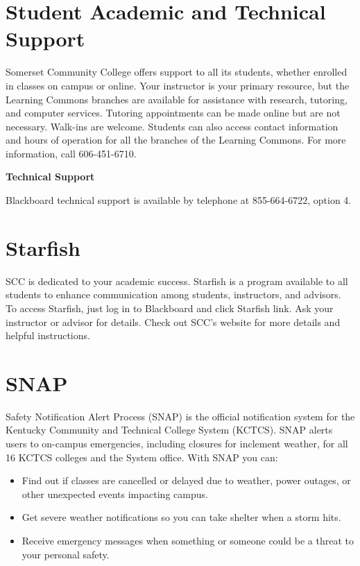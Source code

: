 \clearpage

\section*{Student Academic and Technical Support}

Somerset Community College offers support to all its students, whether enrolled in classes on campus or online. Your instructor is your primary resource, but the Learning Commons branches are available for assistance with research, tutoring, and computer services. Tutoring appointments can be made online but are not necessary. Walk-ins are welcome. Students can also access contact information and hours of operation for all the branches of the Learning Commons. For more information, call 606-451-6710.

\begin{tcolorbox}[coursetip]
{\bfseries Technical Support}

Blackboard technical support is available by telephone at 855-664-6722, option 4.
\end{tcolorbox}



\section*{Starfish}

SCC is dedicated to your academic success. Starfish is a program available to all students to enhance communication among students, instructors, and advisors. To access Starfish, just log in to Blackboard and click Starfish link. Ask your instructor or advisor for details. Check out SCC's website for more details and helpful instructions.

\section*{SNAP}

Safety Notification Alert Process (SNAP) is the official notification system for the Kentucky Community and Technical College System (KCTCS). SNAP alerts users to on-campus emergencies, including closures for inclement weather, for all 16 KCTCS colleges and the System office. With SNAP you can:

\begin{itemize}
\item Find out if classes are cancelled or delayed due to weather, power outages, or other unexpected events impacting campus.
\item Get severe weather notifications so you can take shelter when a storm hits.
\item Receive emergency messages when something or someone could be a threat to your personal safety.
\end{itemize}


